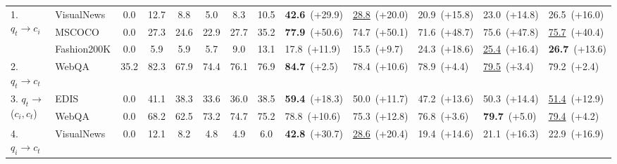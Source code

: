 \begin{table}
{\begin{tabular}{ll|c|ccccc|lllll}
\multirow{3}{*}{1. $q_t \to c_i$}
         & VisualNews               & 0.0 & 12.7 & 8.8 & 5.0 & 8.3 & 10.5  & \textbf{42.6}~\textcolor{positive}{\large (+29.9)} & \underline{28.8}~\textcolor{positive}{\large (+20.0)}& 20.9~\textcolor{positive}{\large (+15.8)}& 23.0~\textcolor{positive}{\large (+14.8)}& 26.5~\textcolor{positive}{\large (+16.0)}\\
         & MSCOCO                 & 0.0& 27.3 & 24.6 & 22.9 & 27.7 & 35.2  & \textbf{77.9}~\textcolor{positive}{\large (+50.6)} & 74.7~\textcolor{positive}{\large (+50.1)}& 71.6~\textcolor{positive}{\large (+48.7)}& 75.6~\textcolor{positive}{\large (+47.8)}& \underline{75.7}~\textcolor{positive}{\large (+40.4)}\\
         & Fashion200K             & 0.0& 5.9 & 5.9 & 5.7 & 9.0 & 13.1  & 17.8~\textcolor{positive}{\large (+11.9)} & 15.5~\textcolor{positive}{\large (+9.7)}& 24.3~\textcolor{positive}{\large (+18.6)}& \underline{25.4}~\textcolor{positive}{\large (+16.4)}& \textbf{26.7}~\textcolor{positive}{\large (+13.6)}\\
         \midrule
         2. $q_t \to c_t$
         & WebQA     & 35.2& 82.3 & 67.9 & 74.4 & 76.1 & 76.9  & \textbf{84.7}~\textcolor{positive}{\large (+2.5)} & 78.4~\textcolor{positive}{\large (+10.6)}& 78.9~\textcolor{positive}{\large (+4.4)}& \underline{79.5}~\textcolor{positive}{\large (+3.4)}& 79.2~\textcolor{positive}{\large (+2.4)}\\
         \midrule
         \multirow{2}{*}{3. $q_t \to$ ($c_i, c_t$)}
         & EDIS  & 0.0& 41.1 & 38.3 & 33.6 & 36.0 & 38.5  & \textbf{59.4}~\textcolor{positive}{\large (+18.3)} & 50.0~\textcolor{positive}{\large (+11.7)}& 47.2~\textcolor{positive}{\large (+13.6)}& 50.3~\textcolor{positive}{\large (+14.4)}& \underline{51.4}~\textcolor{positive}{\large (+12.9)}\\
         & WebQA & 0.0& 68.2 & 62.5 & 73.2 & 74.7 & 75.2  & 78.8~\textcolor{positive}{\large (+10.6)} & 75.3~\textcolor{positive}{\large (+12.8)}& 76.8~\textcolor{positive}{\large (+3.6)}& \textbf{79.7}~\textcolor{positive}{\large (+5.0)}& \underline{79.4}~\textcolor{positive}{\large (+4.2)}\\
         \midrule
         \multirow{3}{*}{4. $q_i \to c_t$}
         & VisualNews              & 0.0& 12.1 & 8.2 & 4.8 & 4.9 & 6.0  & \textbf{42.8}~\textcolor{positive}{\large (+30.7)} & \underline{28.6}~\textcolor{positive}{\large (+20.4)}& 19.4~\textcolor{positive}{\large (+14.6)}& 21.1~\textcolor{positive}{\large (+16.3)}& 22.9~\textcolor{positive}{\large (+16.9)}\\

\end{tabular}}
\end{table}

